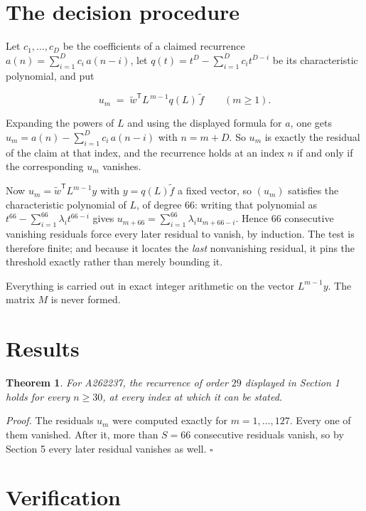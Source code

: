\documentclass[11pt]{article}
\newtheorem{theorem}{Theorem}
\theoremstyle{definition}
\begin{document}
\section{The decision procedure}

Let $c_1,\dots,c_D$ be the coefficients of a claimed recurrence $a(n) = \sum_{i=1}^{D} c_i\,a(n-i)$, let $q(t) = t^{D} - \sum_{i=1}^{D} c_i t^{D-i}$ be its characteristic polynomial, and put

\[u_m \;=\; \tilde w^{\mathsf T} L^{\,m-1} q(L)\,\tilde f \qquad (m \ge 1).\]

Expanding the powers of $L$ and using the displayed formula for $a$, one gets $u_m = a(n) - \sum_{i=1}^{D} c_i\,a(n-i)$ with $n = m + D$. So $u_m$ is exactly the residual of the claim at that index, and the recurrence holds at an index $n$ if and only if the corresponding $u_m$ vanishes.

Now $u_m = \tilde w^{\mathsf T} L^{m-1} y$ with $y = q(L)\tilde f$ a fixed vector, so $(u_m)$ satisfies the characteristic polynomial of $L$, of degree $66$: writing that polynomial as $t^{66} - \sum_{i=1}^{66} \lambda_i t^{66-i}$ gives $u_{m+66} = \sum_{i=1}^{66} \lambda_i u_{m+66-i}$. Hence $66$ consecutive vanishing residuals force every later residual to vanish, by induction. The test is therefore finite; and because it locates the {\itshape last} nonvanishing residual, it pins the threshold exactly rather than merely bounding it.

Everything is carried out in exact integer arithmetic on the vector $L^{m-1}y$. The matrix $M$ is never formed.

\section{Results}

\begin{theorem} For A262237, the recurrence of order $29$ displayed in Section 1 holds for every $n \ge 30$, at every index at which it can be stated.\end{theorem}

{\itshape Proof.} The residuals $u_m$ were computed exactly for $m = 1,\dots,127$. Every one of them vanished. After it, more than $S = 66$ consecutive residuals vanish, so by Section 5 every later residual vanishes as well. $\square$

\section{Verification}
\end{document}
